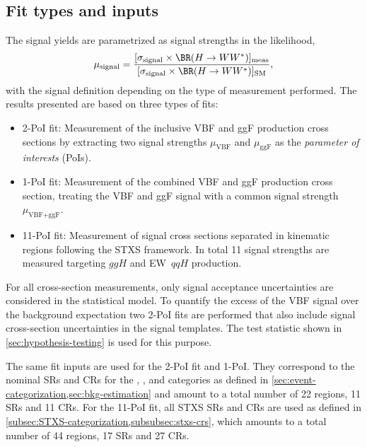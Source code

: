 \subsection{Fit types and inputs}
The signal yields are parametrized as signal strengths in the likelihood, 
\begin{equation}
    \label{eq:incl-ggF-VBF-signal-strengths}
    \mu_{\text{signal}} = \frac{ [ \sigma_{\text{signal}}  \times \BR(H \to WW^*) ]_\text{meas} } { [ \sigma_{\text{signal}} \times \BR(H \to WW^*) ]_\text{SM}}, 
\end{equation}
with the signal definition depending on the type of measurement performed.
The results presented are based on three types of fits:
\begin{itemize}
    \item 2-PoI fit: Measurement of the inclusive VBF and ggF production cross sections by extracting two signal strengths $\mu_{\text{VBF}}$ and $\mu_{\text{ggF}}$ as the \emph{parameter of interests} (PoIs).
    \item 1-PoI fit: Measurement of the combined VBF and ggF production cross section, treating the VBF and ggF signal with a common signal strength $\mu_{\text{VBF+ggF}}$.
    \item 11-PoI fit: Measurement of signal cross sections separated in kinematic regions following the STXS framework. In total 11 signal strengths are measured targeting $ggH$ and EW~$qqH$ production.
\end{itemize}
For all cross-section measurements, only signal acceptance uncertainties are considered in the statistical model. 
To quantify the excess of the VBF signal over the background expectation two 2-PoI fits are performed that also include signal cross-section uncertainties in the signal templates. 
The test statistic shown in \cref{sec:hypothesis-testing} is used for this purpose.

The same fit inputs are used for the 2-PoI fit and 1-PoI. They correspond to the nominal SRs and CRs for the \ZeroJet, \OneJet, and \TwoJet categories as defined in \cref{sec:event-categorization,sec:bkg-estimation} and amount to a total number of 22 regions, 11 SRs and 11 CRs.
For the 11-PoI fit, all STXS SRs and CRs are used as defined in \cref{subsec:STXS-categorization,subsubsec:stxs-crs}, which amounts to a total number of 44 regions, 17 SRs and 27 CRs. 

